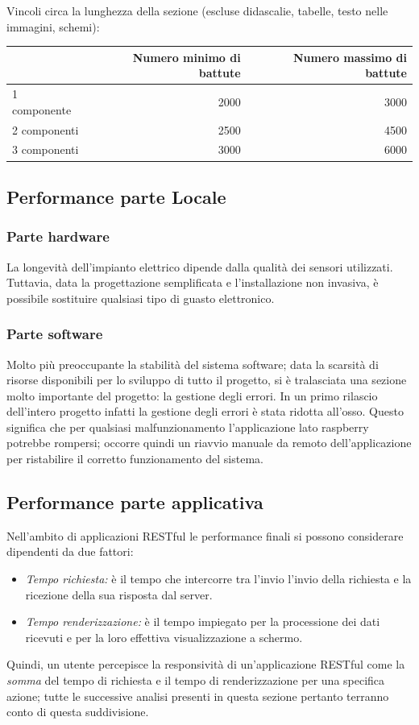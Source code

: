 \documentclass[12pt]{article}
\begin{document}
Vincoli circa la lunghezza della sezione (escluse didascalie, tabelle, testo nelle immagini, schemi):

\vspace{1cm}
\begin{tabular}{l|rr}
 & Numero minimo di battute & Numero massimo di battute \\
 \hline
 1 componente & 2000 & 3000 \\
 2 componenti & 2500 & 4500 \\
 3 componenti & 3000 & 6000 \\
 \hline
\end{tabular}


\newpage
\subsection{Performance parte Locale}
\subsubsection{Parte hardware}
La longevità dell'impianto elettrico dipende dalla qualità dei sensori utilizzati. Tuttavia, data la progettazione semplificata e l'installazione non invasiva, è possibile sostituire qualsiasi tipo di guasto elettronico.
\subsubsection{Parte software}
Molto più preoccupante la stabilità del sistema software; data la scarsità di risorse disponibili per lo sviluppo di tutto il progetto, si è tralasciata una sezione molto importante del progetto: la gestione degli errori. In un primo rilascio dell'intero progetto infatti la gestione degli errori è stata ridotta all'osso. Questo significa che per qualsiasi malfunzionamento l'applicazione lato raspberry potrebbe rompersi; occorre quindi un riavvio manuale da remoto dell'applicazione per ristabilire il corretto funzionamento del sistema.
\subsection{Performance parte applicativa}
Nell'ambito di applicazioni RESTful le performance finali si possono considerare dipendenti da due fattori:
\begin{itemize}
\item \textit{Tempo richiesta:} è il tempo che intercorre tra l'invio l'invio della richiesta e la ricezione della sua risposta dal server.
\item \textit{Tempo renderizzazione:} è il tempo impiegato per la processione dei dati ricevuti e per la loro effettiva visualizzazione a schermo.
\end{itemize}
Quindi, un utente percepisce la responsività di un'applicazione RESTful come la \textit{somma} del tempo di richiesta e il tempo di renderizzazione per una specifica azione; tutte le successive analisi presenti in questa sezione pertanto terranno conto di questa suddivisione.
\end{document}
